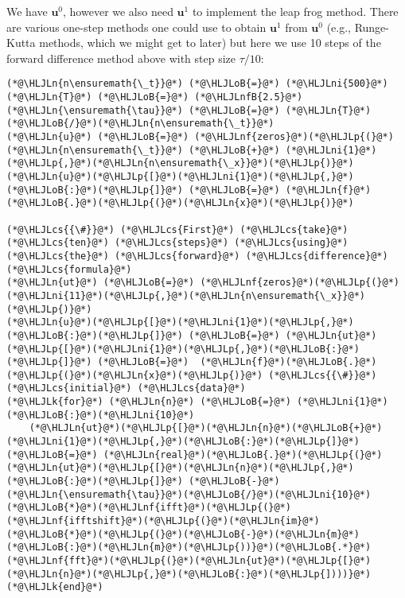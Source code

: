 \documentclass[12pt,a4paper]{article}
\newcommand{\HLJLk}[1]{\textcolor[RGB]{148,91,176}{\textbf{#1}}}
\newcommand{\HLJLn}[1]{#1}
\newcommand{\HLJLnf}[1]{\textcolor[RGB]{66,102,213}{#1}}
\newcommand{\HLJLnfB}[1]{\textcolor[RGB]{59,151,46}{#1}}
\newcommand{\HLJLni}[1]{\textcolor[RGB]{59,151,46}{#1}}
\newcommand{\HLJLoB}[1]{\textcolor[RGB]{102,102,102}{\textbf{#1}}}
\newcommand{\HLJLp}[1]{#1}
\newcommand{\HLJLcs}[1]{\textcolor[RGB]{153,153,119}{\textit{#1}}}
\begin{document}
We have $\mathbf{u}^0$, however we also need $\mathbf{u}^1$ to implement the leap frog method.  There are various one-step methods one could use to obtain $\mathbf{u}^1$ from $\mathbf{u}^0$ (e.g., Runge-Kutta methods, which we might get to later) but here we use 10 steps of the forward difference method above with step size $\tau/10$:


\begin{lstlisting}
(*@\HLJLn{n\ensuremath{\_t}}@*) (*@\HLJLoB{=}@*) (*@\HLJLni{500}@*)
(*@\HLJLn{T}@*) (*@\HLJLoB{=}@*) (*@\HLJLnfB{2.5}@*)
(*@\HLJLn{\ensuremath{\tau}}@*) (*@\HLJLoB{=}@*) (*@\HLJLn{T}@*)(*@\HLJLoB{/}@*)(*@\HLJLn{n\ensuremath{\_t}}@*)
(*@\HLJLn{u}@*) (*@\HLJLoB{=}@*) (*@\HLJLnf{zeros}@*)(*@\HLJLp{(}@*)(*@\HLJLn{n\ensuremath{\_t}}@*) (*@\HLJLoB{+}@*) (*@\HLJLni{1}@*)(*@\HLJLp{,}@*)(*@\HLJLn{n\ensuremath{\_x}}@*)(*@\HLJLp{)}@*)
(*@\HLJLn{u}@*)(*@\HLJLp{[}@*)(*@\HLJLni{1}@*)(*@\HLJLp{,}@*)(*@\HLJLoB{:}@*)(*@\HLJLp{]}@*) (*@\HLJLoB{=}@*) (*@\HLJLn{f}@*)(*@\HLJLoB{.}@*)(*@\HLJLp{(}@*)(*@\HLJLn{x}@*)(*@\HLJLp{)}@*) 

(*@\HLJLcs{{\#}}@*) (*@\HLJLcs{First}@*) (*@\HLJLcs{take}@*) (*@\HLJLcs{ten}@*) (*@\HLJLcs{steps}@*) (*@\HLJLcs{using}@*) (*@\HLJLcs{the}@*) (*@\HLJLcs{forward}@*) (*@\HLJLcs{difference}@*) (*@\HLJLcs{formula}@*)
(*@\HLJLn{ut}@*) (*@\HLJLoB{=}@*) (*@\HLJLnf{zeros}@*)(*@\HLJLp{(}@*)(*@\HLJLni{11}@*)(*@\HLJLp{,}@*)(*@\HLJLn{n\ensuremath{\_x}}@*)(*@\HLJLp{)}@*)
(*@\HLJLn{u}@*)(*@\HLJLp{[}@*)(*@\HLJLni{1}@*)(*@\HLJLp{,}@*)(*@\HLJLoB{:}@*)(*@\HLJLp{]}@*) (*@\HLJLoB{=}@*) (*@\HLJLn{ut}@*)(*@\HLJLp{[}@*)(*@\HLJLni{1}@*)(*@\HLJLp{,}@*)(*@\HLJLoB{:}@*)(*@\HLJLp{]}@*) (*@\HLJLoB{=}@*)  (*@\HLJLn{f}@*)(*@\HLJLoB{.}@*)(*@\HLJLp{(}@*)(*@\HLJLn{x}@*)(*@\HLJLp{)}@*) (*@\HLJLcs{{\#}}@*) (*@\HLJLcs{initial}@*) (*@\HLJLcs{data}@*)
(*@\HLJLk{for}@*) (*@\HLJLn{n}@*) (*@\HLJLoB{=}@*) (*@\HLJLni{1}@*)(*@\HLJLoB{:}@*)(*@\HLJLni{10}@*)
    (*@\HLJLn{ut}@*)(*@\HLJLp{[}@*)(*@\HLJLn{n}@*)(*@\HLJLoB{+}@*)(*@\HLJLni{1}@*)(*@\HLJLp{,}@*)(*@\HLJLoB{:}@*)(*@\HLJLp{]}@*) (*@\HLJLoB{=}@*) (*@\HLJLn{real}@*)(*@\HLJLoB{.}@*)(*@\HLJLp{(}@*)(*@\HLJLn{ut}@*)(*@\HLJLp{[}@*)(*@\HLJLn{n}@*)(*@\HLJLp{,}@*)(*@\HLJLoB{:}@*)(*@\HLJLp{]}@*) (*@\HLJLoB{-}@*) (*@\HLJLn{\ensuremath{\tau}}@*)(*@\HLJLoB{/}@*)(*@\HLJLni{10}@*)(*@\HLJLoB{*}@*)(*@\HLJLnf{ifft}@*)(*@\HLJLp{(}@*)(*@\HLJLnf{ifftshift}@*)(*@\HLJLp{(}@*)(*@\HLJLn{im}@*)(*@\HLJLoB{*}@*)(*@\HLJLp{(}@*)(*@\HLJLoB{-}@*)(*@\HLJLn{m}@*)(*@\HLJLoB{:}@*)(*@\HLJLn{m}@*)(*@\HLJLp{))}@*)(*@\HLJLoB{.*}@*)(*@\HLJLnf{fft}@*)(*@\HLJLp{(}@*)(*@\HLJLn{ut}@*)(*@\HLJLp{[}@*)(*@\HLJLn{n}@*)(*@\HLJLp{,}@*)(*@\HLJLoB{:}@*)(*@\HLJLp{])))}@*)
(*@\HLJLk{end}@*)


\end{lstlisting}
\end{document}
